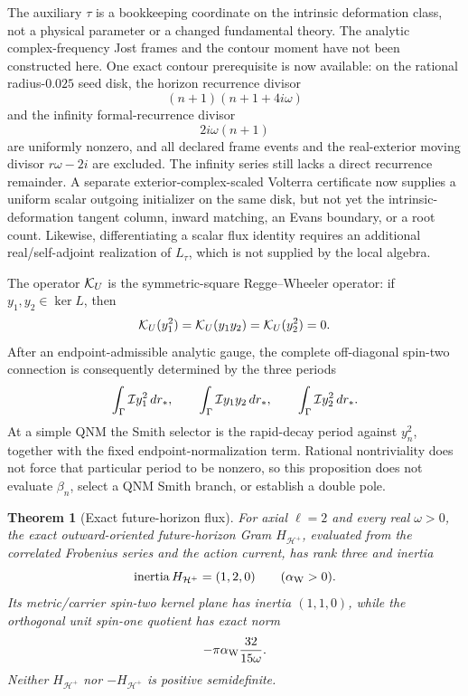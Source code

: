 \documentclass[11pt]{article}
\newtheorem{theorem}{Theorem}[section]
\theoremstyle{definition}
\theoremstyle{remark}
\begin{document}
The auxiliary \(\tau\) is a bookkeeping coordinate on the intrinsic
deformation class, not a physical parameter or a changed fundamental
theory.  The analytic complex-frequency Jost frames and the contour moment
have not been constructed here.  One exact contour prerequisite is now
available: on the rational radius-\(0.025\) seed disk, the horizon recurrence
divisor
\[
 (n+1)(n+1+4i\omega)
\]
and the infinity formal-recurrence divisor
\[
 2i\omega(n+1)
\]
are uniformly nonzero, and all declared frame events and the real-exterior
moving divisor \(r\omega-2i\) are excluded.  The infinity series still lacks
a direct recurrence remainder.  A separate exterior-complex-scaled Volterra
certificate now supplies a uniform scalar outgoing initializer on the same
disk, but not yet the intrinsic-deformation tangent column, inward matching,
an Evans boundary, or a root count.  Likewise, differentiating a scalar flux
identity requires an additional real/self-adjoint realization of
\(L_\tau\), which is not supplied by the local algebra.

The operator \({\cal K}_U\) is the symmetric-square Regge--Wheeler
operator: if \(y_1,y_2\in\ker L\), then
\[
 {\cal K}_U(y_1^2)
 ={\cal K}_U(y_1y_2)
 ={\cal K}_U(y_2^2)=0.
\]
After an endpoint-admissible analytic gauge, the complete off-diagonal
spin-two connection is consequently determined by the three periods
\[
 \int_\Gamma{\cal I}y_1^2\,dr_*,
 \qquad
 \int_\Gamma{\cal I}y_1y_2\,dr_*,
 \qquad
 \int_\Gamma{\cal I}y_2^2\,dr_*.
\]
At a simple QNM the Smith selector is the rapid-decay period against
\(y_n^2\), together with the fixed endpoint-normalization term.  Rational
nontriviality does not force that particular period to be nonzero, so this
proposition does not evaluate \(\beta_n\), select a QNM Smith branch, or
establish a double pole.

\begin{theorem}[Exact future-horizon flux]
\label{thm:axial-future-horizon-gram}
For axial \(\ell=2\) and every real \(\omega>0\), the exact
outward-oriented future-horizon Gram \(H_{\mathcal H^+}\), evaluated from
the correlated Frobenius series and the action current, has rank three and inertia
\[
 \operatorname{inertia}H_{\mathcal H^+}=(1,2,0)
 \qquad(\alpha_{\rm W}>0).
\]
Its metric/carrier spin-two kernel plane has inertia \((1,1,0)\), while the
orthogonal unit spin-one quotient has exact norm
\[
 -\pi\alpha_{\rm W}\frac{32}{15\omega}.
\]
Neither \(H_{\mathcal H^+}\) nor \(-H_{\mathcal H^+}\) is positive
semidefinite.
\end{theorem}
\end{document}
